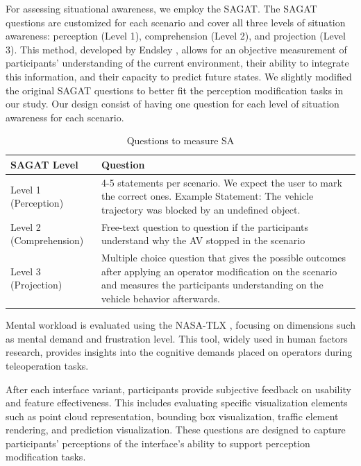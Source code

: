 For assessing situational awareness, we employ the \ac{SAGAT}. The \ac{SAGAT} questions are customized for each scenario and cover all three levels of situation awareness: perception (Level 1), comprehension (Level 2), and projection (Level 3). This method, developed by Endsley \cite{endsley1988sagat}, allows for an objective measurement of participants' understanding of the current environment, their ability to integrate this information, and their capacity to predict future states. We slightly modified the original \ac{SAGAT} questions to better fit the perception modification tasks in our study. Our design consist of having one question for each level of situation awareness for each scenario.
\begin{table}[h!]
    \centering
    \begin{tabular}{|p{6cm}|p{7.8cm}|}
    \hline
    \textbf{SAGAT Level} & \textbf{Question} \\
    \hline
    Level 1 (Perception) & 4-5 statements per scenario. We expect the user to mark the correct ones. Example Statement: The vehicle trajectory was blocked by an undefined object. \\ \hline
    Level 2 (Comprehension) & Free-text question to question if the participants understand why the \ac{AV} stopped in the scenario \\ \hline
    Level 3 (Projection) & Multiple choice question that gives the possible outcomes after applying an operator modification on the scenario and measures the participants understanding on the vehicle behavior afterwards. \\ \hline
    \end{tabular}
    \caption{Questions to measure \ac{SA}}
    \label{table:scenariosunsolvable}
    \end{table}

Mental workload is evaluated using the \ac{NASA-TLX} \cite{hart1988development}, focusing on dimensions such as mental demand and frustration level. This tool, widely used in human factors research, provides insights into the cognitive demands placed on operators during teleoperation tasks.

After each interface variant, participants provide subjective feedback on usability and feature effectiveness. This includes evaluating specific visualization elements such as point cloud representation, bounding box visualization, traffic element rendering, and prediction visualization. These questions are designed to capture participants' perceptions of the interface's ability to support perception modification tasks.

